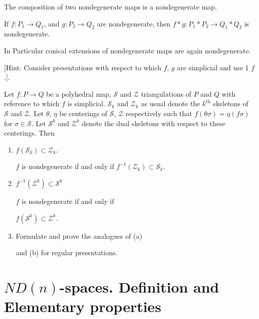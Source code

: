 \begin{exprop}\label{chap5-exprop5.1.4}
The composition of two nondegenerate maps is a nondegenerate map.
\end{exprop}

\begin{exprop}\label{chap5-exprop5.1.5}
If $f:P_{1}\to Q_{1}$, and $g:P_{2}\to Q_{2}$ are nondegenerate, then $f\ast g:P_{1}\ast P_{2}\to Q_{1}\ast Q_{2}$ is nondegenerate.


In Particular conical extensions of nondegenerate maps are again nondegenerate.

[Hint: Consider presentations with respect to which $f$, $g$ are simplicial and use 1 $f$.].
\end{exprop}

Let $f:P\to Q$ be a polyhedral map, $\mathscr{S}$ and $\mathscr{Z}$ triangulations of $P$ and $Q$ with reference to which $f$ is simplicial. $\mathscr{S}_{k}$ and $\mathscr{Z}_{k}$ as usual denote the $k^{\text{th}}$ skeletons of $\mathscr{S}$ and $\mathscr{Z}$. Let $\theta$, $\eta$ be centerings of $\mathscr{S}$, $\mathscr{Z}$ respectively such that $f(\theta\sigma)=\eta(f\sigma)$ for $\sigma\in \mathscr{S}$. Let $\mathscr{S}^{k}$ and $\mathscr{Z}^{k}$ denote the dual skeletons with respect to these centerings. Then

\begin{ex}\label{chap5-ex5.1.6}
\begin{enumerate}
\renewcommand{\theenumi}{\alph{enumi}}
\renewcommand{\labelenumi}{(\theenumi)}
\item $f(\mathscr{S}_{k})\subset \mathscr{Z}_{k}$.

$f$ is nondegenerate if and only if $f^{-1}(\mathscr{Z}_{k})\subset \mathscr{S}_{k}$. 

\item $f^{-1}(\mathscr{Z}^{k})\subset \mathscr{S}^{k}$\pageoriginale

$f$ is nondegenerate if and only if

$f(\mathscr{S}^{k})\subset \mathscr{Z}^{k}$.

\item Formulate and prove the analogues of (a)

and (b) for regular presentations.
\end{enumerate}
\end{ex}


\section{$ND(n)$-spaces. Definition and Elementary properties}\label{chap5-prop5.2} 


